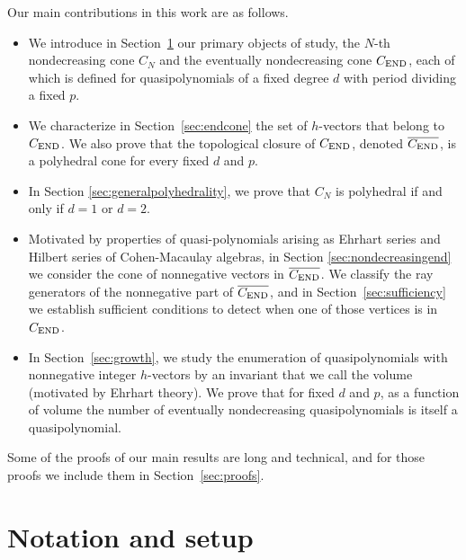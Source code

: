 \documentclass[12pt]{amsart}
\theoremstyle{definition}
\numberwithin{equation}{section}
\renewcommand\>{\rangle}
\newcommand\<{\langle}
\newcommand\0{\mathbf{0}}
\newcommand{\CEND}{C_\textnormal{END}}
\begin{document}
Our main contributions in this work are as follows.
\begin{itemize}
\item We introduce in Section~\ref{sec:notation} our primary objects of study, the $N$-th nondecreasing cone $C_N$ and the eventually nondecreasing cone $\CEND$, each of which is defined for quasipolynomials of a fixed degree $d$ with period dividing a fixed $p$.
\item We characterize in Section~\ref{sec:endcone} the set of $h$-vectors that belong to $\CEND$.
We also prove that the topological closure of $\CEND$, denoted $\overline{\CEND}$, is a polyhedral cone for every fixed $d$ and $p$.
\item In Section \ref{sec:generalpolyhedrality}, we prove that $C_N$ is polyhedral if and only if $d = 1$ or $d = 2$.
\item Motivated by properties of quasi-polynomials arising as Ehrhart series and Hilbert series of Cohen-Macaulay algebras, in Section \ref{sec:nondecreasingend} we consider the cone of nonnegative vectors in $\overline{\CEND}$.
We classify the ray generators of the nonnegative part of $\overline{\CEND}$, and in Section~\ref{sec:sufficiency} we establish sufficient conditions to detect when one of those vertices is in $\CEND$.
\item In Section~\ref{sec:growth}, we study the enumeration of quasipolynomials with nonnegative integer $h$-vectors by an invariant that we call the volume (motivated by Ehrhart theory).
We prove that for fixed $d$ and $p$, as a function of volume the number of eventually nondecreasing quasipolynomials is itself a quasipolynomial.
\end{itemize}

Some of the proofs of our main results are long and technical, and for those proofs we include them in Section~\ref{sec:proofs}.

\section{Notation and setup}%
\label{sec:notation}%
\end{document}
